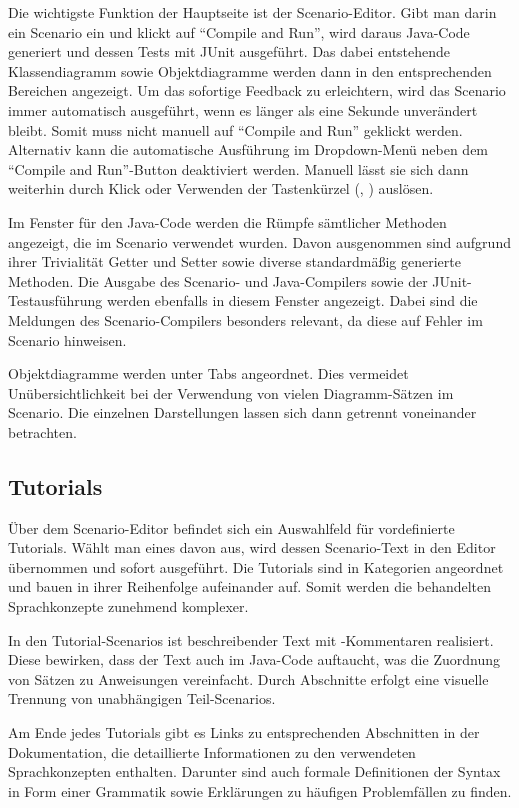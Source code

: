 Die wichtigste Funktion der Hauptseite ist der Scenario-Editor.
Gibt man darin ein Scenario ein und klickt auf ``Compile and Run'', wird daraus Java-Code generiert und dessen Tests mit JUnit ausgeführt.
Das dabei entstehende Klassendiagramm sowie Objektdiagramme werden dann in den entsprechenden Bereichen angezeigt.
Um das sofortige Feedback zu erleichtern, wird das Scenario immer automatisch ausgeführt, wenn es länger als eine Sekunde unverändert bleibt.
Somit muss nicht manuell auf ``Compile and Run'' geklickt werden.
Alternativ kann die automatische Ausführung im Dropdown-Menü neben dem ``Compile and Run''-Button deaktiviert werden.
Manuell lässt sie sich dann weiterhin durch Klick oder Verwenden der Tastenkürzel (, ) auslösen.

Im Fenster für den Java-Code werden die Rümpfe sämtlicher Methoden angezeigt, die im Scenario verwendet wurden.
Davon ausgenommen sind aufgrund ihrer Trivialität Getter und Setter sowie diverse standardmäßig generierte Methoden.
Die Ausgabe des Scenario- und Java-Compilers sowie der JUnit-Testausführung werden ebenfalls in diesem Fenster angezeigt.
Dabei sind die Meldungen des Scenario-Compilers besonders relevant, da diese auf Fehler im Scenario hinweisen.

Objektdiagramme werden unter Tabs angeordnet.
Dies vermeidet Unübersichtlichkeit bei der Verwendung von vielen Diagramm-Sätzen im Scenario.
Die einzelnen Darstellungen lassen sich dann getrennt voneinander betrachten.

\subsection{Tutorials}\label{subsec:tutorials}

Über dem Scenario-Editor befindet sich ein Auswahlfeld für vordefinierte Tutorials.
Wählt man eines davon aus, wird dessen Scenario-Text in den Editor übernommen und sofort ausgeführt.
Die Tutorials sind in Kategorien angeordnet und bauen in ihrer Reihenfolge aufeinander auf.
Somit werden die behandelten Sprachkonzepte zunehmend komplexer.

In den Tutorial-Scenarios ist beschreibender Text mit \code{//}-Kommentaren realisiert.
Diese bewirken, dass der Text auch im Java-Code auftaucht, was die Zuordnung von Sätzen zu Anweisungen vereinfacht.
Durch Abschnitte erfolgt eine visuelle Trennung von unabhängigen Teil-Scenarios.

Am Ende jedes Tutorials gibt es Links zu entsprechenden Abschnitten in der Dokumentation, die detaillierte Informationen zu den verwendeten Sprachkonzepten enthalten.
Darunter sind auch formale Definitionen der Syntax in Form einer Grammatik sowie Erklärungen zu häufigen Problemfällen zu finden.

